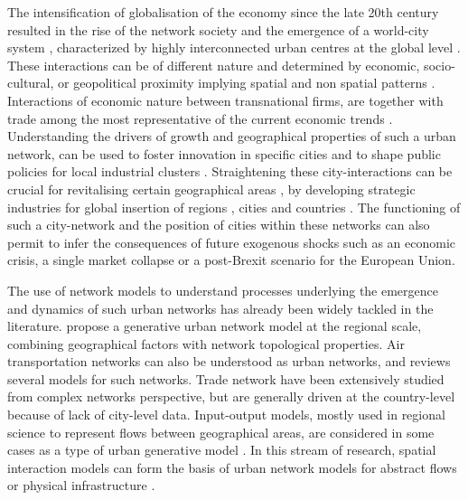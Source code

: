 \documentclass[11pt]{article}
\begin{document}
The intensification of globalisation of the economy since the late 20th century resulted in the rise of the network society \cite{castells2000networksociety} and the emergence of a world-city system \cite{taylor2001specification}, characterized by highly interconnected urban centres at the global level \cite{sassen1991}. These interactions can be of different nature and determined by economic, socio-cultural, or geopolitical proximity implying spatial and non spatial patterns \cite{martinus2018global}. Interactions of economic nature between transnational firms, are together with trade among the most representative of the current economic trends \cite{taylor2001specification}. Understanding the drivers of growth and geographical properties of such a urban network, can be used to foster innovation in specific cities and to shape public policies for local industrial clusters \cite{turkina2016structure}. Straightening these city-interactions can be crucial for revitalising certain geographical areas \cite{Clarke2018}, by developing strategic industries for global insertion of regions \cite{dawley2019creating}, cities \cite{gluckler2016relational} and countries \cite{martinus2019brokerage}. The functioning of such a city-network and the position of cities within these networks \cite{gluckler2016relational} can also permit to infer the consequences of future exogenous shocks such as an economic crisis, a single market collapse or a post-Brexit scenario for the European Union.

The use of network models to understand processes underlying the emergence and dynamics of such urban networks has already been widely tackled in the literature. \cite{dai2016simulating} propose a generative urban network model at the regional scale, combining geographical factors with network topological properties. Air transportation networks can also be understood as urban networks, and \cite{zanin2013modelling} reviews several models for such networks. Trade network have been extensively studied from complex networks perspective, but are generally driven at the country-level \cite{garlaschelli2005structure} because of lack of city-level data. Input-output models, mostly used in regional science to represent flows between geographical areas, are considered in some cases as a type of urban generative model \cite{jin1993generation}. In this stream of research, spatial interaction models \cite{dennett2013multilevel} can form the basis of urban network models for abstract flows \cite{dai2016generative} or physical infrastructure \cite{raimbault2020indirect}.
\end{document}
